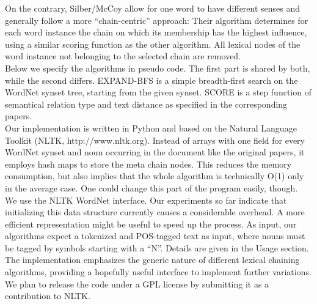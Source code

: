 \documentclass[11pt, a4paper, abstraction]{scrartcl}
\begin{document}
On the contrary, Silber/McCoy allow for one word to have different senses and generally follow a more ``chain-centric'' approach: Their algorithm determines for each word instance the chain on which its membership has the highest influence, using a similar scoring function as the other algorithm. All lexical nodes of the word instance not belonging to the selected chain are removed. \\
Below we specify the algorithms in pseudo code. The first part is shared by both, while the second differs. EXPAND-BFS is a simple breadth-first search on the WordNet synset tree, starting from the given synset. SCORE is a step function of semantical relation type and text distance as specified in the corresponding papers. \\

Our implementation is written in Python and based on the Natural Language Toolkit (NLTK, http://www.nltk.org). Instead of arrays with one field for every WordNet synset and noun occurring in the document like the original papers, it employs hash maps to store the meta chain nodes. This reduces the memory consumption, but also implies that the whole algorithm is technically O(1) only in the average case. One could change this part of the program easily, though. \\
We use the NLTK WordNet interface. Our experiments so far indicate that initializing this data structure currently causes a considerable overhead. A more efficient representation might be useful to speed up the process. As input, our algorithms expect a tokenized and POS-tagged text as input, where nouns must be tagged by symbols starting with a ``N''.  Details are given in the Usage section. The implementation emphasizes the generic nature of different lexical chaining algorithms, providing a hopefully useful interface to implement further variations. We plan to release the code under a GPL license by submitting it as a contribution to NLTK.
\end{document}
